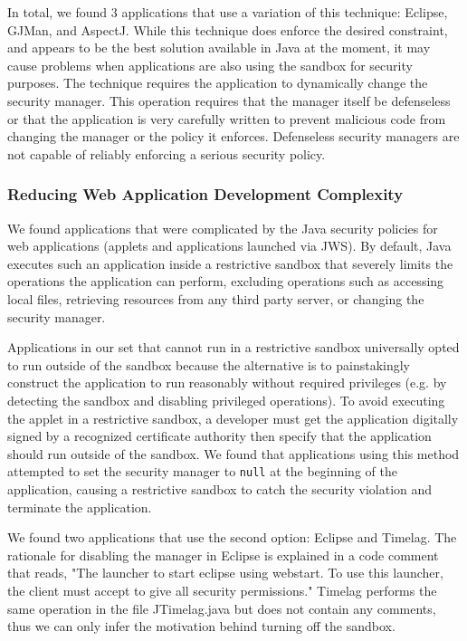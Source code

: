 \documentclass{sig-alternate}
\begin{document}
In total, we found 3 applications that use a variation of this technique:
Eclipse, GJMan, and AspectJ. While this technique does enforce the
desired constraint, and appears to be the best solution available
in Java at the moment, it may cause problems when applications are
also using the sandbox for security purposes. The technique requires
the application to dynamically change the security manager. This operation
requires that the manager itself be defenseless or that the application
is very carefully written to prevent malicious code from changing
the manager or the policy it enforces. Defenseless security managers
are not capable of reliably enforcing a serious security policy.

\subsubsection{Reducing Web Application Development Complexity}\label{sub:Reducing-Web-Application-Complexity}

We found applications that were complicated by the Java security policies
for web applications (applets and applications launched via JWS). By default, Java executes such an application inside a restrictive
sandbox that severely limits the operations the application can perform,
excluding operations such as accessing local files, retrieving resources
from any third party server, or changing the security manager. 

Applications in our set that cannot run in a restrictive sandbox universally opted to run outside of the sandbox because the alternative is to painstakingly construct the application to run reasonably without required privileges (e.g. by detecting the sandbox and disabling privileged operations). To avoid executing the applet in a restrictive
sandbox, a developer must get the application digitally signed
by a recognized certificate authority then specify that the application should
run outside of the sandbox. We found that applications using this method attempted
to set the security manager to \texttt{null} at the beginning of the
application, causing a restrictive sandbox to catch the security violation and
terminate the application.

We found two applications that use the second option: Eclipse and
Timelag. The rationale for disabling the manager in Eclipse is explained in a code comment that reads, "The launcher to start eclipse using webstart. To use this launcher, the client must accept to give all security permissions." Timelag performs the same operation in the file JTimelag.java but does not contain any comments, thus we can only infer the motivation behind turning off the sandbox.
\end{document}
